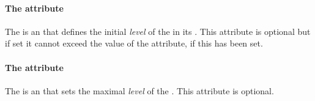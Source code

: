 \paragraph{The   attribute}
The  is an  that defines the initial \emph{level} of the \QualitativeSpecies in its . This attribute is optional but if set it cannot exceed the value of the  attribute, if this has been set.

\paragraph{The  attribute}
The  is an  that sets the maximal \emph{level} of the . This attribute is optional.

%
%
%
%
%
%




